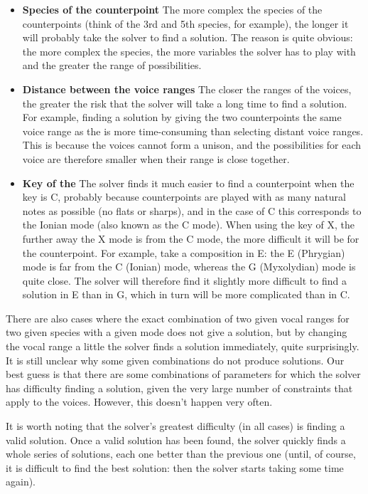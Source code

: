 \begin{itemize}
    \item \textbf{Species of the counterpoint} \textendash{} The more complex the species of the counterpoints (think of the 3rd and 5th species, for example), the longer it will probably take the solver to find a solution. The reason is quite obvious: the more complex the species, the more variables the solver has to play with and the greater the range of possibilities.  
    \item \textbf{Distance between the voice ranges} \textendash{}  The closer the ranges of the voices, the greater the risk that the solver will take a long time to find a solution. For example, finding a solution by giving the two counterpoints the same voice range as the \cfs is more time-consuming than selecting distant voice ranges. This is because the voices cannot form a unison, and the possibilities for each voice are therefore smaller when their range is close together. 
    \item \textbf{Key of the \cf} \textendash{} The solver finds it much easier to find a counterpoint when the key is C, probably because counterpoints are played with as many natural notes as possible (no flats or sharps), and in the case of C this corresponds to the Ionian mode (also known as the C mode). When using the key of X, the further away the X mode is from the C mode, the more difficult it will be for the counterpoint. For example, take a composition in E: the E (Phrygian) mode is far from the C (Ionian) mode, whereas the G (Myxolydian) mode is quite close. The solver will therefore find it slightly more difficult to find a solution in E than in G, which in turn will be more complicated than in C.
\end{itemize}
There are also cases where the exact combination of two given vocal ranges for two given species with a given mode does not give a solution, but by changing the vocal range a little the solver finds a solution immediately, quite surprisingly. It is still unclear why some given combinations do not produce solutions. Our best guess is that there are some combinations of parameters for which the solver has difficulty finding a solution, given the very large number of constraints that apply to the voices. However, this doesn't happen very often.

It is worth noting that the solver's greatest difficulty (in all cases) is finding a valid solution. Once a valid solution has been found, the solver quickly finds a whole series of solutions, each one better than the previous one (until, of course, it is difficult to find the best solution: then the solver starts taking some time again).


